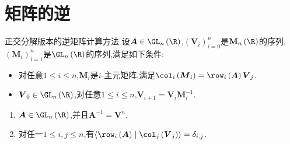 \section{矩阵的逆}

\begin{theorem}{正交分解版本的逆矩阵计算方法}{}
	设$\boldsymbol{A}\in\GL_{n}\left(\R\right)$,$\left(\boldsymbol{V}_{i}\right)_{i=0}^{n}$是$\mathbf{M}_{n}\left(\R\right)$的序列,$\left(\boldsymbol{M}_{i}\right)_{i=1}^{n}$是$\GL_{n}\left(\R\right)$的序列,满足如下条件:
	\begin{itemize}
		\item 对任意$1\leq i\leq n$,$\boldsymbol{M}_{i}$是$i$-主元矩阵,满足$\col_{i}\left(\boldsymbol{M}_{i}\right)=\row_{i}\left(\boldsymbol{A}\right)\boldsymbol{V}_{j}$.
		\item $\boldsymbol{V}_{0}\in\GL_{n}\left(\R\right)$,对任意$1\leq i\leq n$,$\boldsymbol{V}_{i+1}=\boldsymbol{V}_{i}\boldsymbol{M}_{i}^{-1}$.
	\end{itemize}
	\begin{enumerate}
		\item $\boldsymbol{A}\in\GL_{n}\left(\R\right)$,并且$\boldsymbol{A}^{-1}=\boldsymbol{V}^{n}$.
		\item 对任一$1\leq i,j\leq n$,有$\langle\row_{i}\left(\boldsymbol{A}\right)\mid\col_{j}\left(\boldsymbol{V}_{j}\right)\rangle=\delta_{i,j}$.
	\end{enumerate}
\end{theorem}